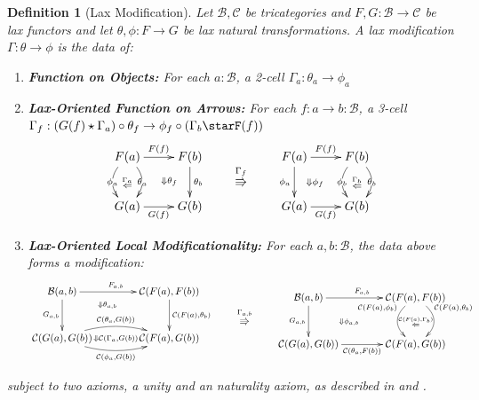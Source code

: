 \documentclass{article}
\numberwithin{equation}{section}
\theoremstyle{definition}
\theoremstyle{plain}
\newtheorem{definition}[equation]{Definition}
\begin{document}
\begin{definition}[Lax Modification]  Let $\mathcal{B}, \mathcal{C}$ be tricategories and $F, G: \mathcal{B} \to \mathcal{C}$ be lax functors and let $\theta, \phi: F \to G$ be lax natural transformations. A lax modification $\Gamma: \theta \to \phi$ is the data of:
	\begin{enumerate}[label = $\bullet$]
		\item \textbf{Function on Objects:} For each $a:\mathcal{B}$, a 2-cell $\Gamma_a: \theta_a \to \phi_a$
		\item \textbf{Lax-Oriented Function on Arrows:} For each $f:a \to b:\mathcal{B}$, a 3-cell $\Gamma_f: (G(f)\star \Gamma_a) \circ \theta_{f} \to \phi_f \circ (\Gamma_b\starF(f))$
		\[\vcenter{\xymatrix{
				F(a) \ar[r]^{F(f)} \ar@/_1pc/[d]|{\phi_a} \ar@{}[d]|{\overset{\Gamma_a}{\Leftarrow}} \ar@/^1pc/[d]|{\theta_a} \ar@/^/@{{}{ }{}}[dr]|(0.6){\Downarrow \theta_f} & F(b) \ar[d]^{\theta_b}\\
				G(a) \ar[r]_{G(f)} & G(b)
		}}
		\qquad \overset{\Gamma_f}{\Rrightarrow} \qquad
		\vcenter{\xymatrix{
				F(a) \ar[d]_{\phi_a} \ar[r]^{F(f)} \ar@/_/@{{}{ }{}}[dr]|(0.4){\Downarrow \phi_f} & F(b) \ar@/_1pc/[d]|{\phi_b} \ar@{}[d]|{\overset{\Gamma_b}{\Leftarrow}} \ar@/^1pc/[d]|{\theta_b}\\
				G(a) \ar[r]_{G(f)} & G(b)
		}}
		\]
		\item \textbf{Lax-Oriented Local Modificationality:} For each $a,b:\mathcal{B}$, the data above forms a modification:
		\[\vcenter{\xymatrix@C=4em@R=3em{
				\mathcal{B}(a,b) \ar@/^/@{{}{ }{}}[dr]|(0.4){\Downarrow \theta_{a,b}} \ar[r]^{F_{a,b}} \ar[d]_{G_{a,b}} & \mathcal{C}(F(a),F(b)) \ar[d]^{\mathcal{C}(F(a),\theta_b)}\\
				\mathcal{C}(G(a),G(b)) \ar@/^1pc/[r]^{\mathcal{C}(\theta_a,G(b))}
				\ar@{{}{ }{}}[r]|{\Downarrow \mathcal{C}(\Gamma_a,G(b))}
				\ar@/_1pc/[r]_{\mathcal{C}(\phi_a,G(b))} & \mathcal{C}(F(a),G(b))
		}}
		\qquad \overset{\Gamma_{a,b}}{\Rrightarrow} \qquad
		\vcenter{\xymatrix@C=4em@R=3em{
				\mathcal{B}(a,b) \ar@/_/@{{}{ }{}}[dr]|(0.4){\Downarrow \phi_{a,b}} \ar[r]^{F_{a,b}} \ar[d]_{G_{a,b}} & \mathcal{C}(F(a),F(b)) \ar@/^1.5pc/[d]^(0.3){\mathcal{C}(F(a),\theta_b)}
				\ar@{{}{ }{}}[d]|{\overset{\mathcal{C}(F(a),\Gamma_b)}{\Leftarrow}}
				\ar@/_1.5pc/[d]_(0.3){\mathcal{C}(F(a),\phi_b)}\\
				\mathcal{C}(G(a),G(b)) \ar[r]_{\mathcal{C}(\theta_a,F(b))} & \mathcal{C}(F(a),G(b))
		}}\]
	\end{enumerate}
	subject to two axioms, a unity and an naturality axiom, as described in \cite{gordon1995coherence} and \cite{gurski_2013}.
\end{definition}
\end{document}

